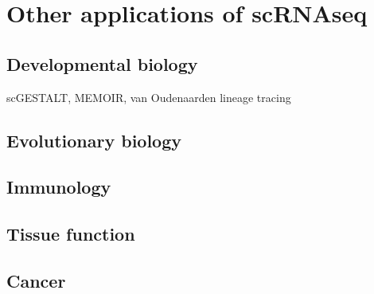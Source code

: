 
\section{Other applications of scRNAseq}

\subsection{Developmental biology}

scGESTALT, MEMOIR, van Oudenaarden lineage tracing

\subsection{Evolutionary biology} 


\subsection{Immunology}


\subsection{Tissue function}


\subsection{Cancer}

